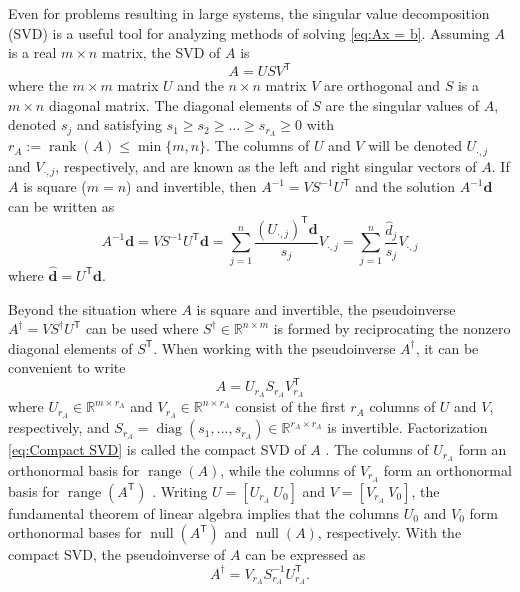 \documentclass[12pt]{article}
\newcommand{\mA}{m}	%
\newcommand{\rA}{r_A}	%
\newcommand{\dVec}{\mathbf{d}}	%
\newcommand{\trans}[1]{{#1}^\mathsf{T}}	%
\newcommand{\inv}[1]{{#1}^{-1}}	%
\newcommand{\pinv}[1]{{#1}^\dagger}	%
\DeclareMathOperator{\diag}{diag}	%
\DeclareMathOperator{\rank}{rank}	%
\DeclareMathOperator{\range}{range}	%
\DeclareMathOperator{\nullspace}{null}	%
\newcommand{\singular}{s}	%
\newcommand{\svd}[1]{\widehat{#1}}	%
\begin{document}
Even for problems resulting in large systems, the singular value decomposition (SVD) is a useful tool for analyzing methods of solving \eqref{eq:Ax = b}.  Assuming $A$ is a real $\mA \times n$ matrix, the SVD of $A$ is
\begin{equation}
\label{eq:SVD}
A = US\trans{V}
\end{equation}
where the $\mA \times \mA$ matrix $U$ and the $n \times n$ matrix $V$ are orthogonal and $S$ is a $\mA \times n$ diagonal matrix. The diagonal elements of $S$ are the singular values of $A$, denoted $\singular_j$ and satisfying $\singular_1 \geq \singular_2 \geq \ldots \geq \singular_{\rA} \geq 0$ with $\rA := \rank(A) \leq \min\{\mA,n\}$. The columns of $U$ and $V$ will be denoted $U_{\cdot,j}$ and $V_{\cdot,j}$, respectively, and are known as the left and right singular vectors of $A$. If $A$ is square ($\mA = n$) and invertible, then $\inv{A} = V\inv{S}\trans{U}$ and the solution $\inv{A}\dVec$ can be written as
\begin{equation}
\label{eq:InvProd}
\inv{A}\dVec = VS^{-1}{\trans{U}}\dVec = \sum_{j=1}^{n} \frac{{\trans{(U_{\cdot,j})}}\dVec}{\singular_j}V_{\cdot,j} = \sum_{j=1}^{n} \frac{\svd{d}_j}{\singular_j}V_{\cdot,j}
\end{equation}
where $\svd{\dVec} = \trans{U}\dVec$. \par 
Beyond the situation where $A$ is square and invertible, the pseudoinverse \cite{Penrose1955} $\pinv{A} = V\pinv{S}\trans{U}$ can be used where $\pinv{S} \in \mathbb{R}^{n \times \mA}$ is formed by reciprocating the nonzero diagonal elements of $\trans{S}$. When working with the pseudoinverse $\pinv{A}$, it can be convenient to write
\begin{equation}
\label{eq:Compact SVD}
A = U_{\rA}S_{\rA}\trans{V}_{\rA}
\end{equation}
where $U_{\rA} \in \mathbb{R}^{\mA \times \rA}$ and $V_{\rA} \in \mathbb{R}^{n \times \rA}$ consist of the first $\rA$ columns of $U$ and $V$, respectively, and $S_{\rA} = \diag(\singular_1,\ldots,\singular_{\rA}) \in \mathbb{R}^{\rA \times \rA}$ is invertible. Factorization \eqref{eq:Compact SVD} is called the compact SVD of $A$ \cite{ABT,Leon2010}. The columns of $U_{\rA}$ form an orthonormal basis for $\range(A)$, while the columns of $V_{\rA}$ form an orthonormal basis for $\range(\trans{A})$ \cite[p.~340]{Leon2010}. Writing $U = [U_{\rA} ~ U_0]$ and $V = [V_{\rA} ~ V_0]$, the fundamental theorem of linear algebra \cite{Strang1993} implies that the columns $U_0$  and $V_0$ form orthonormal bases for $\nullspace(\trans{A})$ and $\nullspace(A)$, respectively. With the compact SVD, the pseudoinverse of $A$ can be expressed as 
\begin{equation}
\label{eq:Pseudoinverse}
    \pinv{A} = V_{\rA}\inv{S}_{\rA}\trans{U}_{\rA}.
\end{equation}
\end{document}
